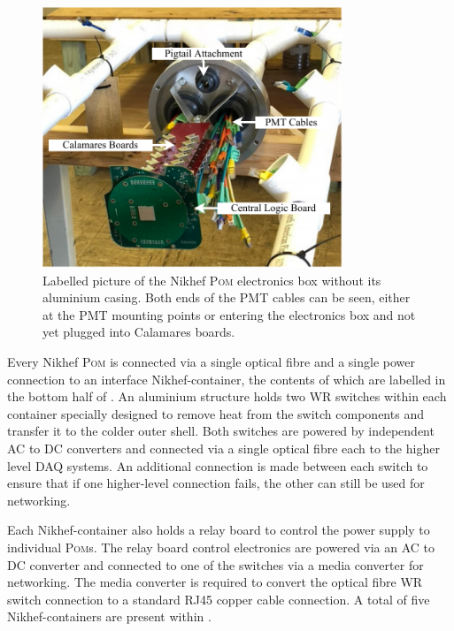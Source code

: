 \begin{figure} %
    \includegraphics[width=0.8\textwidth]{diagrams/5-daq/nikhef_plane.pdf}
    \caption[Labelled picture of the Nikhef \textsc{Pom} electronics box]
    {Labelled picture of the Nikhef \textsc{Pom} electronics box without its aluminium casing.
        Both ends of the PMT cables can be seen, either at the PMT mounting points or entering the
        electronics box and not yet plugged into Calamares boards.}
    \label{fig:nikhef_plane}
\end{figure}

Every Nikhef \textsc{Pom} is connected via a single optical fibre and a single power connection to
an interface Nikhef-container, the contents of which are labelled in the bottom half of
. An aluminium structure holds two WR switches within each container
specially designed to remove heat from the switch components and transfer it to the colder outer
shell. Both switches are powered by independent AC to DC converters and connected via a single
optical fibre each to the higher level DAQ systems. An additional connection is made between each
switch to ensure that if one higher-level connection fails, the other can still be used for
networking.

Each Nikhef-container also holds a relay board to control the power supply to individual
\textsc{Pom}s. The relay board control electronics are powered via an AC to DC converter and
connected to one of the switches via a media converter for networking. The media converter is
required to convert the optical fibre WR switch connection to a standard RJ45 copper cable
connection. A total of five Nikhef-containers are present within \chipsfive.

